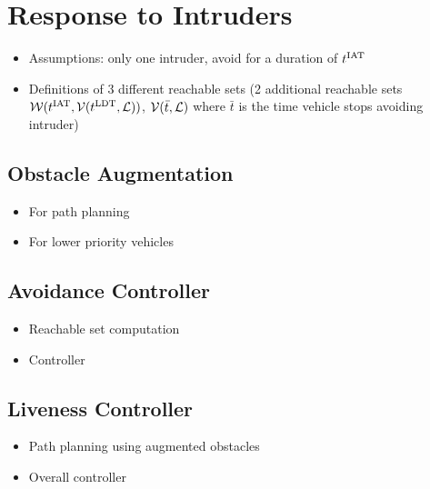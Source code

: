 \section{Response to Intruders \label{sec:HJIVI}}
\begin{itemize}
\item Assumptions: only one intruder, avoid for a duration of $t^\text{IAT}$
\item Definitions of 3 different reachable sets (2 additional reachable sets $\mathcal{W}(t^\text{IAT}, \mathcal{V}(t^\text{LDT}, \mathcal{L}))$, $\mathcal{V}(\bar t, \mathcal{L})$ where $\bar t$ is the time vehicle stops avoiding intruder)
\end{itemize}

\subsection{Obstacle Augmentation}
\begin{itemize}
\item For path planning
\item For lower priority vehicles
\end{itemize}

\subsection{Avoidance Controller}
\begin{itemize}
\item Reachable set computation
\item Controller
\end{itemize}

\subsection{Liveness Controller}
\begin{itemize}
\item Path planning using augmented obstacles
\item Overall controller
\end{itemize}
